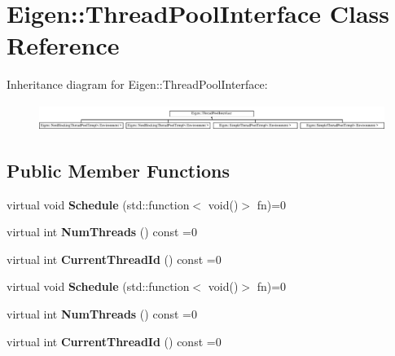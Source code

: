 \hypertarget{class_eigen_1_1_thread_pool_interface}{}\section{Eigen\+:\+:Thread\+Pool\+Interface Class Reference}
\label{class_eigen_1_1_thread_pool_interface}
Inheritance diagram for Eigen\+:\+:Thread\+Pool\+Interface\+:\begin{figure}[H]
\begin{center}
\leavevmode
\includegraphics[height=0.872274cm]{class_eigen_1_1_thread_pool_interface}
\end{center}
\end{figure}
\subsection*{Public Member Functions}
\begin{DoxyCompactItemize}
\item 
\mbox{\label{class_eigen_1_1_thread_pool_interface_ab146fb580760ac892c54cbed1af37bde}} 
virtual void {\bfseries Schedule} (std\+::function$<$ void()$>$ fn)=0
\item 
\mbox{\label{class_eigen_1_1_thread_pool_interface_adacb3cc3a0f166adcf6de0539fdceafc}} 
virtual int {\bfseries Num\+Threads} () const =0
\item 
\mbox{\label{class_eigen_1_1_thread_pool_interface_a94d121885318a862f7443dedbfc383c9}} 
virtual int {\bfseries Current\+Thread\+Id} () const =0
\item 
\mbox{\label{class_eigen_1_1_thread_pool_interface_ab146fb580760ac892c54cbed1af37bde}} 
virtual void {\bfseries Schedule} (std\+::function$<$ void()$>$ fn)=0
\item 
\mbox{\label{class_eigen_1_1_thread_pool_interface_adacb3cc3a0f166adcf6de0539fdceafc}} 
virtual int {\bfseries Num\+Threads} () const =0
\item 
\mbox{\label{class_eigen_1_1_thread_pool_interface_a94d121885318a862f7443dedbfc383c9}} 
virtual int {\bfseries Current\+Thread\+Id} () const =0
\end{DoxyCompactItemize}


